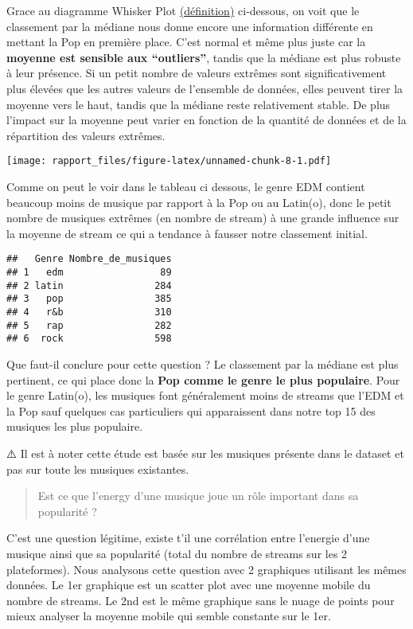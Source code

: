 \documentclass[
]{article}
\begin{document}
Grace au diagramme Whisker Plot
\href{https://cdn2.boryl.fr/2020/11/3d5689a5-box-plot-boi\%CC\%82tes-a\%CC\%80-moustaches--300x223.png}{(définition)}
ci-dessous, on voit que le classement par la médiane nous donne encore
une information différente en mettant la Pop en première place. C'est
normal et même plus juste car la \textbf{moyenne est sensible aux
``outliers''}, tandis que la médiane est plus robuste à leur présence.
Si un petit nombre de valeurs extrêmes sont significativement plus
élevées que les autres valeurs de l'ensemble de données, elles peuvent
tirer la moyenne vers le haut, tandis que la médiane reste relativement
stable. De plus l'impact sur la moyenne peut varier en fonction de la
quantité de données et de la répartition des valeurs extrêmes.

\texttt{[image: rapport\_files/figure-latex/unnamed-chunk-8-1.pdf]}

Comme on peut le voir dans le tableau ci dessous, le genre EDM contient
beaucoup moins de musique par rapport à la Pop ou au Latin(o), donc le
petit nombre de musiques extrêmes (en nombre de stream) à une grande
influence sur la moyenne de stream ce qui a tendance à fausser notre
classement initial.

\begin{verbatim}
##   Genre Nombre_de_musiques
## 1   edm                 89
## 2 latin                284
## 3   pop                385
## 4   r&b                310
## 5   rap                282
## 6  rock                598
\end{verbatim}

Que faut-il conclure pour cette question ? Le classement par la médiane
est plus pertinent, ce qui place donc la \textbf{Pop comme le genre le
plus populaire}. Pour le genre Latin(o), les musiques font généralement
moins de streams que l'EDM et la Pop sauf quelques cas particuliers qui
apparaissent dans notre top 15 des musiques les plus populaire.

⚠️ Il est à noter cette étude est basée sur les musiques présente dans
le dataset et pas sur toute les musiques existantes.

\begin{quote}
Est ce que l'energy d'une musique joue un rôle important dans sa
popularité ?
\end{quote}

C'est une question légitime, existe t'il une corrélation entre l'energie
d'une musique ainsi que sa popularité (total du nombre de streams sur
les 2 plateformes). Nous analysons cette question avec 2 graphiques
utilisant les mêmes données. Le 1er graphique est un scatter plot avec
une moyenne mobile du nombre de streams. Le 2nd est le même graphique
sans le nuage de points pour mieux analyser la moyenne mobile qui semble
constante sur le 1er.
\end{document}
